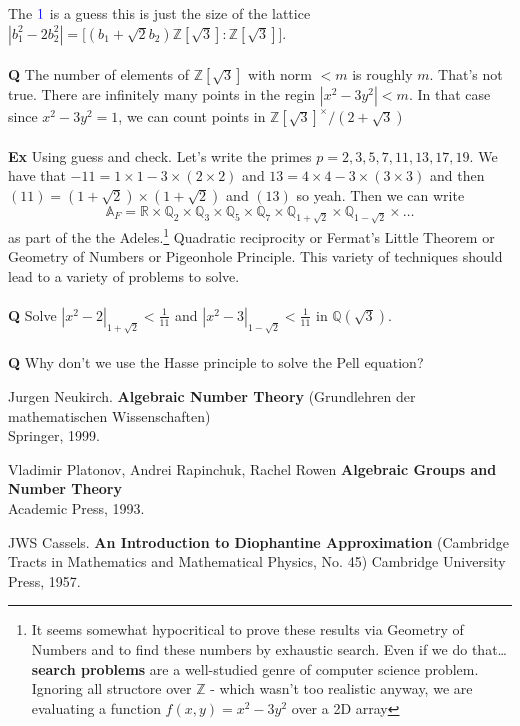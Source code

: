 \documentclass[12pt]{article}
\begin{document}
The $\color{blue}1$ is a guess this is just the size of the lattice $|b_1^2 - 2b_2^2| =  \big[(b_1 + \sqrt{2}b_2)\mathbb{Z}[\sqrt{3}]: \mathbb{Z}[\sqrt{3}]\big] $.  \\ \\
\textbf{Q} The number of elements of $\mathbb{Z}[\sqrt{3}]$ with norm $ < m$ is roughly $m$. That's not true.  There are infinitely many points in the regin $|x^2 - 3y^2| < m$.  In that case since $ x^2 - 3y^2 = 1$, we can count points in $\mathbb{Z}[\sqrt{3}]^\times/(2 + \sqrt{3})$ \\ \\
\textbf{Ex} Using guess and check.  Let's write the primes $p = 2,3,5,7,11,13,17,19$. We have that $-11 =  1 \times 1 - 3 \times (2 \times 2)$ and $13 = 4 \times 4 - 3 \times (3 \times 3) $ and then $(11) = (1+\sqrt{2}) \times (1 + \sqrt{2})$ and $(13)$ so yeah.  Then we can write $$
\mathbb{A}_F = \mathbb{R} \times \mathbb{Q}_2 \times \mathbb{Q}_3 \times \mathbb{Q}_5 \times \mathbb{Q}_7 \times \mathbb{Q}_{1+\sqrt{2}} \times \mathbb{Q}_{1-\sqrt{2}} \times \dots $$ as part of the the Adeles.\footnote{It seems somewhat hypocritical to prove these results via Geometry of Numbers and to find these numbers by exhaustic search.  Even if we do that\dots \textbf{search problems} are a well-studied genre of computer science problem.  Ignoring all structore over $\mathbb{Z}$ - which wasn't too realistic anyway, we are evaluating a function $f(x,y) = x^2 - 3y^2$ over a 2D array} Quadratic reciprocity or Fermat's Little Theorem or Geometry of Numbers or Pigeonhole Principle.  This variety of techniques should lead to a variety of problems to solve.\\ \\
\textbf{Q} Solve $|x^2 - 2 |_{1 + \sqrt{2}} < \frac{1}{11}$ and $|x^2 - 3 |_{1 - \sqrt{2}} < \frac{1}{11}$ in $\mathbb{Q}(\sqrt{3})$. \\ \\
\textbf{Q} Why don't we use the Hasse principle to solve the Pell equation?
\vfill

\begin{thebibliography}{}

\item Jurgen Neukirch. \textbf{Algebraic Number Theory} (Grundlehren der mathematischen Wissenschaften) \\ Springer, 1999.
\item Vladimir Platonov, Andrei Rapinchuk, Rachel Rowen \textbf{Algebraic Groups and Number Theory}  \\ Academic Press, 1993. 
\item JWS Cassels. \textbf{An Introduction to Diophantine Approximation} (Cambridge Tracts in Mathematics and Mathematical Physics, No. 45) Cambridge University Press, 1957.

\end{thebibliography}
\end{document}
